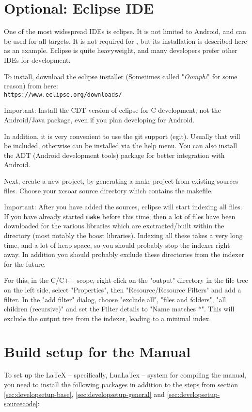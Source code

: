 \section{Optional: Eclipse IDE}
One of the most widespread IDEs is eclipse. It is not limited to Android, and can be used for all targets. It is not required for \xc, but its installation is described here as an example. Eclipse is quite heavyweight, and many developers prefer other IDEs for \xc development.

To install, download the eclipse installer (Sometimes called "\emph{Oomph!}" for some reason) from here:\\
\texttt{https://www.eclipse.org/downloads/}

Important: Install the CDT version of eclipse for C development, not the Android/Java package, even if you plan developing for Android. 

In addition, it is very convenient to use the git support (egit). Usually that will be included, otherwise can be installed via the help menu. You can also install the ADT (Android development tools) package for better integration with Android.

Next, create a new project, by generating a make project from existing sources files. Choose your xcsoar source directory which contains the makefile.

Important: After you have added the sources, eclipse will start indexing all files. If you have already started \texttt{make} before this time, then a lot of files have been downloaded for the various libraries which are exctracted/built within the \xc directory (most notably the boost libraries). Indexing all these takes a very long time, and a lot of heap space, so you should probably stop the indexer right away. In addition you should probably exclude these directories from the indexer for the future.

For this, in the C/C++ scope, right-click on the "output" directory in the file tree on the left side, select "Properties", then "Resource/Resource Filters" and add a filter. In the "add filter" dialog, choose "exclude all", "files and folders", "all children (recursive)" and set the Filter details to "Name matches *".
This will exclude the output tree from the indexer, leading to a minimal index.

\section{Build setup for the Manual}\label{sec:developsetup-manual}
To set up the LaTeX -- specifically, LuaLaTex -- system for compiling the manual, you need to install the following packages in addition to the steps from section \ref{sec:developsetup-base}, \ref{sec:developsetup-general} and \ref{sec:developsetup-sourcecode}:

